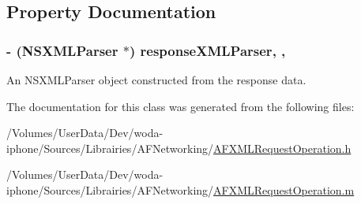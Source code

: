 \subsection{Property Documentation}
\hypertarget{interface_a_f_x_m_l_request_operation_ac30bf93cf79e7859bd62e480f320af55}{
\subsubsection[{response\-X\-M\-L\-Parser}]{\setlength{\rightskip}{0pt plus 5cm}-\/ (N\-S\-X\-M\-L\-Parser $\ast$) response\-X\-M\-L\-Parser\hspace{0.3cm}{\ttfamily [read]}, {\ttfamily [nonatomic]}, {\ttfamily [strong]}}}\label{interface_a_f_x_m_l_request_operation_ac30bf93cf79e7859bd62e480f320af55}
An {\ttfamily N\-S\-X\-M\-L\-Parser} object constructed from the response data. 

The documentation for this class was generated from the following files\-:\begin{DoxyCompactItemize}
\item 
/\-Volumes/\-User\-Data/\-Dev/woda-\/iphone/\-Sources/\-Librairies/\-A\-F\-Networking/\hyperlink{_a_f_x_m_l_request_operation_8h}{A\-F\-X\-M\-L\-Request\-Operation.\-h}\item 
/\-Volumes/\-User\-Data/\-Dev/woda-\/iphone/\-Sources/\-Librairies/\-A\-F\-Networking/\hyperlink{_a_f_x_m_l_request_operation_8m}{A\-F\-X\-M\-L\-Request\-Operation.\-m}\end{DoxyCompactItemize}
